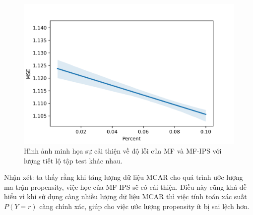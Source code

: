 \begin{figure}[h]
    \centering
    \includegraphics[width = \textwidth]{images/Chapter4/plot_percent1.png}
    \caption{Hình ảnh minh họa sự cải thiện về độ lỗi của MF và MF-IPS với lượng tiết lộ tập test khác nhau.}
    \label{fig:4_percent}
\end{figure}

Nhận xét: ta thấy rằng khi tăng lượng dữ liệu MCAR cho quá trình ước lượng ma trận propensity, việc học của MF-IPS sẽ có cải thiện. Điều này cũng khá dễ hiểu vì khi sử dụng càng nhiều lượng dữ liệu MCAR thì việc tính toán xác suất $P(Y=r)$ càng chính xác, giúp cho việc ước lượng propensity ít bị sai lệch hơn.



